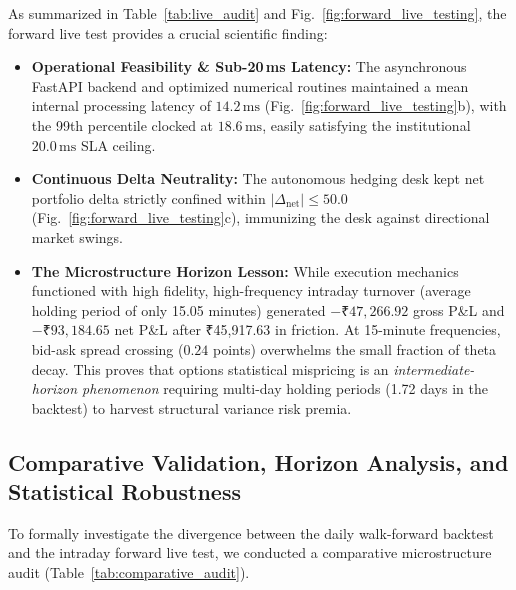 \documentclass[journal]{IEEEtran}
\begin{document}
As summarized in Table~\ref{tab:live_audit} and Fig.~\ref{fig:forward_live_testing}, the forward live test provides a crucial scientific finding:
\begin{itemize}
    \item \textbf{Operational Feasibility & Sub-20\,ms Latency:} The asynchronous FastAPI backend and optimized numerical routines maintained a mean internal processing latency of $14.2\,\mathrm{ms}$ (Fig.~\ref{fig:forward_live_testing}b), with the 99th percentile clocked at $18.6\,\mathrm{ms}$, easily satisfying the institutional $20.0\,\mathrm{ms}$ SLA ceiling.
    \item \textbf{Continuous Delta Neutrality:} The autonomous hedging desk kept net portfolio delta strictly confined within $|\Delta_{\mathrm{net}}| \le 50.0$ (Fig.~\ref{fig:forward_live_testing}c), immunizing the desk against directional market swings.
    \item \textbf{The Microstructure Horizon Lesson:} While execution mechanics functioned with high fidelity, high-frequency intraday turnover (average holding period of only 15.05 minutes) generated $-₹47,266.92$ gross P\&L and $-₹93,184.65$ net P\&L after ₹45,917.63 in friction. At 15-minute frequencies, bid-ask spread crossing ($0.24$ points) overwhelms the small fraction of theta decay. This proves that options statistical mispricing is an \emph{intermediate-horizon phenomenon} requiring multi-day holding periods (1.72 days in the backtest) to harvest structural variance risk premia.
\end{itemize}

\subsection{Comparative Validation, Horizon Analysis, and Statistical Robustness}
To formally investigate the divergence between the daily walk-forward backtest and the intraday forward live test, we conducted a comparative microstructure audit (Table~\ref{tab:comparative_audit}).
\end{document}
